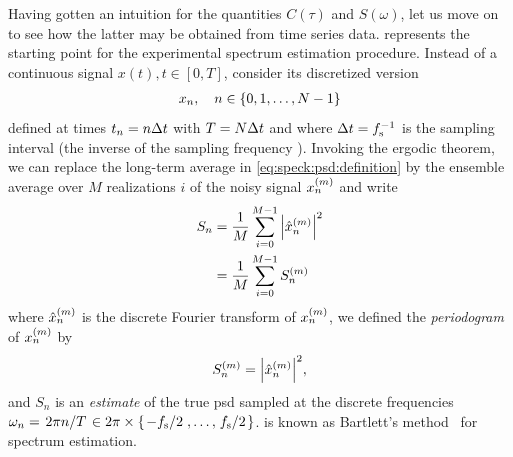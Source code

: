 Having gotten an intuition for the quantities $C(\tau)$ and $S(\omega)$, let us move on to see how the latter may be obtained from time series data.
 represents the starting point for the experimental spectrum estimation procedure.
Instead of a continuous signal $x(t), t\in [0, T]$, consider its discretized version
\begin{align}\label{eq:speck:signal:discrete}
    x_n \qc n\in\lbrace 0, 1, \dotsc, N - 1\rbrace
\end{align}
defined at times $t_n = n\Delta t$ with $T = N\Delta t$ and where $\Delta t = f_{\mathrm{s}}^{-1}$ is the sampling interval (the inverse of the sampling frequency \fs).
Invoking the ergodic theorem,
we can replace the long-term average in \cref{eq:speck:psd:definition} by the ensemble average over $M$ realizations $i$ of the noisy signal $x_n^{(m)}$ and write
\begin{align}\label{eq:speck:psd:bartlett}
    S_n &= \frac{1}{M} \sum_{i=0}^{M-1} \abs{\hat{x}_n^{(m)}}^2 \\
        &= \frac{1}{M} \sum_{i=0}^{M-1} S_n^{(m)}
\end{align}
where $\hat{x}_n^{(m)}$ is the discrete Fourier transform of $x_n^{(m)}$, we defined the \emph{periodogram} of $x_n^{(m)}$ by
\begin{align}\label{eq:speck:periodogram}
    S_n^{(m)} = \abs{\hat{x}_n^{(m)}}^2,
\end{align}
and $S_n$ is an \emph{estimate} of the true \gls{psd} sampled at the discrete frequencies $\omega_n = \flatfrac{2\pi n}{T} \in 2\pi\times\lbrace\flatfrac{-\fs}{2}, \dotsc, \flatfrac{\fs}{2}\rbrace$.
 is known as Bartlett's method~\cite{Bartlett1948} for spectrum estimation.

